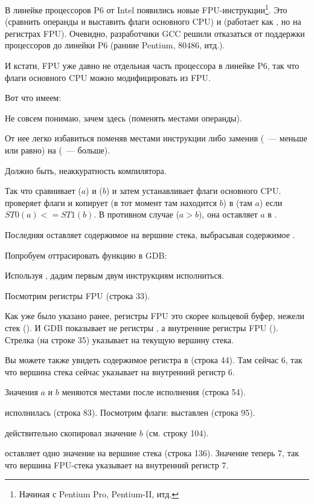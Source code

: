 \label{gcc481_o3}

В линейке процессоров P6 от Intel 
появились новые FPU-инструкции\footnote{Начиная с Pentium Pro, Pentium-II, итд.}.
Это  (сравнить операнды и выставить флаги основного CPU) и
 (работает как , но на регистрах FPU).
Очевидно, разработчики GCC решили отказаться от поддержки процессоров до линейки P6 (ранние Pentium, 80486, итд.).

И кстати, FPU уже давно не отдельная часть процессора в линейке P6, так что флаги основного CPU можно модифицировать из FPU.

Вот что имеем:



Не совсем понимаю, зачем здесь  (поменять местами операнды).

От нее легко избавиться поменяв местами инструкции \FLD либо заменив 
 (~--- меньше или равно) на 
 (~--- больше).

Должно быть, неаккуратность компилятора.

Так что  сравнивает  ($a$) и  ($b$) 
и затем устанавливает флаги основного CPU.
 проверяет флаги и копирует  
(в тот момент там находится $b$) в 
 (там $a$) если $ST0 (a) <= ST1 (b)$.
В противном случае ($a>b$), она оставляет $a$ в .

Последняя \FSTP оставляет содержимое  на вершине стека, выбрасывая содержимое .

Попробуем оттрасировать функцию в GDB:



Используя , дадим первым двум инструкциям \FLD исполниться.

Посмотрим регистры FPU (строка 33).

Как уже было указано ранее, регистры FPU это скорее кольцевой буфер, нежели стек ().
И GDB показывает не регистры , а внутренние регистры FPU (). 
Стрелка (на строке 35) указывает на текущую вершину стека.

Вы можете также увидеть содержимое регистра  в  (строка 44). Там сейчас 6, так что
вершина стека сейчас указывает на внутренний регистр 6.

Значения $a$ и $b$ меняются местами после исполнения  (строка 54).

 исполнилась (строка 83).
Посмотрим флаги: \CF выставлен (строка 95).

 действительно скопировал значение $b$ (см. строку 104).

\FSTP оставляет одно значение на вершине стека (строка 136). 
Значение  теперь 7, так что вершина FPU-стека указывает на внутренний регистр 7.
